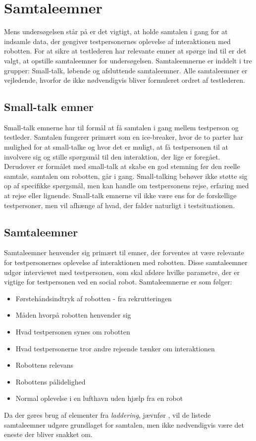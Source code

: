 \section{Samtaleemner}
\label{ParametreSamtaleemner}
%
Mens undersøgelsen står på er det vigtigt, at holde samtalen i gang for at indsamle data, der gengiver testpersonernes oplevelse af interaktionen med robotten. For at sikre at testlederen har relevante emner at spørge ind til er det valgt, at opstille samtaleemner for undersøgelsen. Samtaleemnerne er inddelt i tre grupper: Small-talk, løbende og afsluttende samtaleemner. Alle samtaleemner er vejledende, hvorfor de ikke nødvendigvis bliver formuleret ordret af testlederen.

\subsection{Small-talk emner} 
\label{ParametreISmallTalk}
%
Small-talk emnerne har til formål at få samtalen i gang mellem testperson og testleder. Samtalen fungerer primært som en ice-breaker, hvor de to parter har mulighed for at small-talke og hvor det er muligt, at få testpersonen til at involvere sig og stille spørgsmål til den interaktion, der lige er foregået. Derudover er formålet med small-talk at skabe en god stemning før den reelle samtale, samtalen om robotten, går i gang. Small-talking behøver ikke støtte sig op af specifikke spørgsmål, men kan handle om testpersonens rejse, erfaring med at rejse eller lignende. Small-talk emnerne vil ikke være ens for de forskellige testpersoner, men vil afhænge af hvad, der falder naturligt i testsituationen.  
%
\subsection{Samtaleemner} 
\label{ParametreSamtaleemner}
%
Samtaleemner henvender sig primært til emner, der forventes at være relevante for testpersonernes oplevelse af interaktionen med robotten. Disse samtaleemner udgør interviewet med testpersonen, som skal afsløre hvilke parametre, der er vigtige for testpersonen ved en social robot. Samtaleemnerne er som følger:\blankline
%
\begin{itemize}
\item Førstehåndsindtryk af robotten - fra rekrutteringen
\item Måden hvorpå robotten henvender sig
\item Hvad testpersonen synes om robotten
\item Hvad testpersonerne tror andre rejsende tænker om interaktionen 
\item Robottens relevans
\item Robottens pålidelighed
\item Normal oplevelse i en lufthavn uden hjælp fra en robot\blankline 
\end{itemize}
\noindent
%
Da der gøres brug af elementer fra \textit{laddering}, jævnfør , vil de listede samtaleemner udgøre grundlaget for samtalen, men ikke nødvendigvis være det eneste der bliver snakket om. 
%

